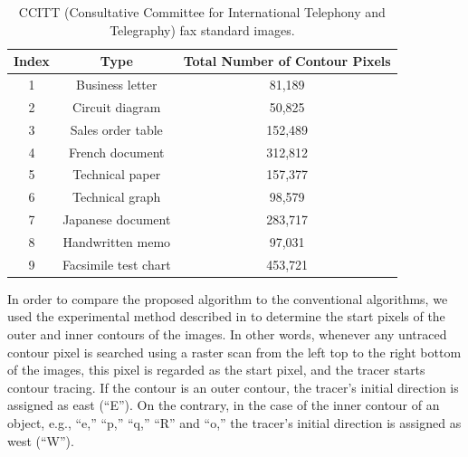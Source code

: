 \documentclass[sensors,article,accept,moreauthors,pdftex,10pt,a4paper]{mdpi}
\begin{document}
\begin{table}[H]
	\centering
	\begin{tabular}{ccc}
		\toprule
		\textbf{Index} & \textbf{Type} & \textbf{Total Number of Contour Pixels} \\
		\midrule
		1 & Business letter & 81,189 \\
		2 & Circuit diagram & 50,825 \\
		3 & Sales order table & 152,489 \\
		4 & French document & 312,812 \\
		5 & Technical paper & 157,377 \\
		6 & Technical graph & 98,579 \\
		7 & Japanese document & 283,717 \\
		8 & Handwritten memo & 97,031 \\
		9 & Facsimile test chart & 453,721 \\
		\bottomrule
	\end{tabular}
	\caption{\protect CCITT (Consultative Committee for International Telephony and Telegraphy) fax \protect \linebreak standard images.}
	\label{table:ccitt}
\end{table}	


In order to compare the proposed algorithm to the conventional algorithms, we used the experimental method described in \cite{Danielsson1981Improvement} to determine the start pixels of the outer and inner contours of the images. In other words, whenever any untraced contour pixel is searched using a raster scan from the left top to the right bottom of the images, this pixel is regarded as the start pixel, and the tracer starts contour tracing. If the contour is an outer contour, the tracer's initial direction is assigned as east (``E''). On the contrary, in the case of the inner contour of an object, e.g., ``e,'' ``p,'' ``q,'' ``R'' and ``o,'' the tracer's initial direction is assigned as west (``W''). 
\end{document}
